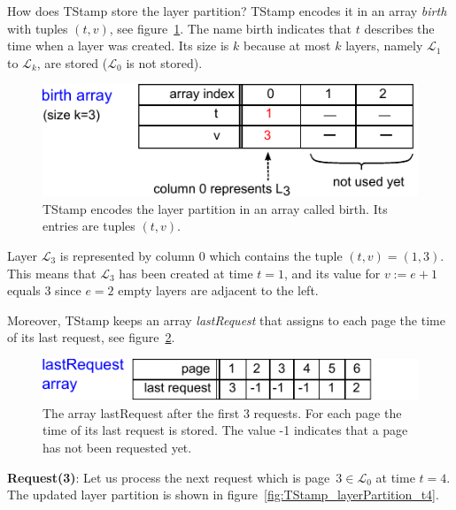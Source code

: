 \documentclass[a4paper,12pt, titlepage]{article}  %
\newcommand{\cl}{\mathcal{L}}   %
\begin{document}
\noindent How does TStamp store the layer partition? TStamp encodes it in an array \emph{birth} with tuples $(t,v)$, 
see figure~\ref{fig:TStamp_birthArray}. 
The name birth indicates that $t$ describes the time when a layer was created. Its size is $k$ because at most 
$k$ layers, namely $\cl_1$ to $\cl_k$, are stored ($\cl_0$ is not stored).

\begin{figure}[htp]
	\centering
	\includegraphics[scale=1.0]{./figures/TStamp_birthArray.pdf}
	\caption{TStamp encodes the layer partition in an array called birth. Its entries are tuples $(t,v)$.} 
	\label{fig:TStamp_birthArray}
\end{figure}

\noindent Layer $\cl_3$ is represented by column 0 which contains the tuple $(t,v)=(1,3)$. This means that 
$\cl_3$ has been created at time $t=1$, and its value for $v:=e+1$ equals 3 since $e=2$ empty layers 
are adjacent to the left. 

Moreover, TStamp keeps an array \emph{lastRequest} that assigns to each page the time of its last request, 
see figure~\ref{fig:TStamp_lastRequest}.

\begin{figure}[htp]
	\centering
	\includegraphics[scale=1.0]{./figures/TStamp_lastRequest.pdf}
	\caption{The array lastRequest after the first 3 requests. For each page the time of its last request is stored. 
                     The value -1 indicates that a page has not been requested yet.} 
	\label{fig:TStamp_lastRequest}
\end{figure}

\noindent \textbf{Request(3)}: Let us process the next request which is page~$3\in \cl_0$ at time $t=4$. The updated 
layer partition is shown in figure~\ref{fig:TStamp_layerPartition_t4}.
\end{document}
